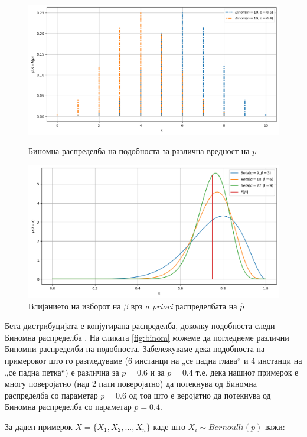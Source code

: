 \documentclass[12pt]{article}
\numberwithin{equation}{section}
\begin{document}
\begin{figure}[h]
    \centering
    \includegraphics[width=1\textwidth]{plots/binom.png}
    \caption{Биномна распределба на подобноста за различна вредност на \(p\)}
    \label{fig:binom}
    \includegraphics[width=1\textwidth]{plots/betas.png}
    \caption{Влијанието на изборот на \(\beta\) врз \textit{a priori} распределбата на \(\widehat{p}\)}
    \label{fig:betas}
\end{figure}

Бета дистрибуцијата е конјугирана распределба, доколку подобноста следи Биномна распределба \cite{wiki:conjugate_prior}. На сликата \ref{fig:binom} можеме да погледнеме различни Биномни распределби на подобноста. Забележуваме дека подобноста на примерокот што го разгледуваме (6 инстанци на „се падна глава“ и 4 инстанци на „се падна петка“) е различна за \(p=0.6\) и за \(p=0.4\) т.е. дека нашиот примерок е многу поверојатно (над 2 пати поверојатно) да потекнува од Биномна распределба со параметар \(p=0.6\) од тоа што е веројатно да потекнува од Биномна распределба со параметар \(p=0.4\).

За даден примерок \(X = \{X_1, X_2, ..., X_n\}\) каде што \(X_i \sim Bernoulli(p)\) важи:
\end{document}
